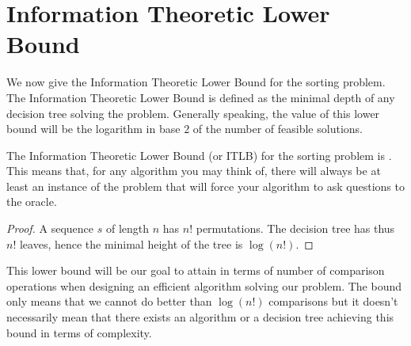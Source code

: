 \section{Information Theoretic Lower Bound}
\label{tree:sorting:ITLB}

We now give the Information Theoretic Lower Bound for the sorting problem. The
Information Theoretic Lower Bound is defined as the minimal depth of any
decision tree solving the problem. Generally speaking, the value of this lower
bound will be the logarithm in base \(2\) of the number of feasible solutions.


\begin{theorem}
The Information Theoretic Lower Bound (or ITLB) for the sorting problem is
. This means that, for any algorithm you may think of,
there will always be at least an instance of the problem that will force your
algorithm to ask  questions to the oracle.
\end{theorem}

\begin{proof}
A sequence $s$ of length $n$ has $n!$ permutations. The decision tree has thus
$n!$ leaves, hence the minimal height of the tree is $\log(n!)$.
\end{proof}

This lower bound will be our goal to attain in terms of number of comparison
operations when designing an efficient algorithm solving our problem. The
bound only means that we cannot do better than \(\log(n!)\) comparisons but it
doesn't necessarily mean that there exists an algorithm or a decision tree
achieving this bound in terms of complexity.
